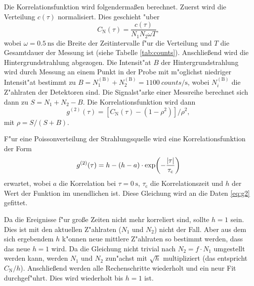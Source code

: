 Die Korrelationsfunktion wird folgenderma\ss en berechnet.
Zuerst wird die Verteilung $c(\tau)$ normalisiert.
Dies geschieht "uber
\begin{equation}
C_\text{N}(\tau)
    =\frac{c(\tau)}{N_1N_2\omega T},
    \label{eq:CN}
\end{equation}
wobei $\omega=\SI{0.5}{\nano\second}$ die Breite der Zeitintervalle f"ur die Verteilung und $T$ die Gesamtdauer der Messung ist (siehe Tabelle \vref{tab:counts}).
Anschlie\ss end wird die Hintergrundstrahlung abgezogen.
Die Intensit"at $B$ der Hintergrundstrahlung wird durch Messung an einem Punkt in der Probe mit m"oglichst niedriger Intensit"at bestimmt zu $B=N_1^{(\text{B})}+N_2^{(\text{B})}=\SI{1100}{counts\per\second}$, wobei $N_i^{(\text{B})}$ die Z"ahlraten der Detektoren sind.
Die Signalst"arke einer Messreihe berechnet sich dann zu $S=N_1+N_2-B$.
Die Korrelationsfunktion wird dann
\begin{equation}
g^{(2)}(\tau)
    =\left[ C_\text{N}(\tau)-(1-\rho^2)\right]/\rho^2,
    \label{eq:g2}
\end{equation}
mit $\rho=S/(S+B)$.

F"ur eine Poissonverteilung der Strahlungsquelle wird eine Korrelationsfunktion der Form
\begin{equation}
g^{(2)}(\tau)
    =h-(h-a)\cdot \exp(-\frac{\abs{\tau}}{\tau_\text{c}})
    \label{eq:fit}
\end{equation}
erwartet, wobei $a$ die Korrelation bei $\tau=\SI{0}{\second}$, $\tau_\text{c}$ die Korrelationszeit und $h$ der Wert der Funktion im unendlichen ist.
Diese Gleichung wird an die Daten \eqref{eq:g2} gefittet.

Da die Ereignisse f"ur gro\ss e Zeiten nicht mehr korreliert sind, sollte $h=1$ sein.
Dies ist mit den aktuellen Z"ahlraten ($N_1$ und $N_2$) nicht der Fall.
Aber aus dem sich ergebendem $h$ k"onnen neue mittlere Z"ahlraten so bestimmt werden, dass das neue $h=1$ wird.
Da die Gleichung nicht trivial nach $N_2=f\cdot N_1$ umgestellt werden kann, werden $N_1$ und $N_2$ zun"achst mit $\sqrt{h}$ multipliziert (das entspricht $C_\text{N}/h$).
Anschlie\ss end werden alle Rechenschritte wiederholt und ein neur Fit durchgef"uhrt.
Dies wird wiederholt bis $h=1 $ ist.
